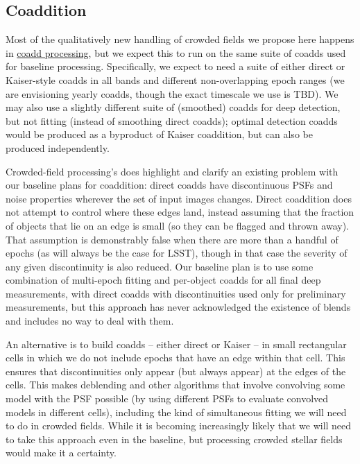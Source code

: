 \documentclass[DM,authoryear,toc]{lsstdoc}
\begin{document}
\subsection{Coaddition}
\label{sec:coaddition}

Most of the qualitatively new handling of crowded fields we propose here happens in \hyperref[sec:coadd-processing]{coadd processing}, but we expect this to run on the same suite of coadds used for baseline processing.
Specifically, we expect to need a suite of either direct or Kaiser-style coadds in all bands and different non-overlapping epoch ranges (we are envisioning yearly coadds, though the exact timescale we use is TBD).
We may also use a slightly different suite of (smoothed) coadds for deep detection, but not fitting (instead of smoothing direct coadds); optimal detection coadds would be produced as a byproduct of Kaiser coaddition, but can also be produced independently.

Crowded-field processing's does highlight and clarify an existing problem with our baseline plans for coaddition: direct coadds have discontinuous PSFs and noise properties wherever the set of input images changes.
Direct coaddition does not attempt to control where these edges land, instead assuming that the fraction of objects that lie on an edge is small (so they can be flagged and thrown away).
That assumption is demonstrably false when there are more than a handful of epochs (as will always be the case for LSST), though in that case the severity of any given discontinuity is also reduced.
Our baseline plan is to use some combination of multi-epoch fitting and per-object coadds for all final deep measurements, with direct coadds with discontinuities used only for preliminary measurements, but this approach has never acknowledged the existence of blends and includes no way to deal with them.

An alternative is to build coadds -- either direct or Kaiser -- in small rectangular cells in which we do not include epochs that have an edge within that cell.
This ensures that discontinuities only appear (but always appear) at the edges of the cells.
This makes deblending and other algorithms that involve convolving some model with the PSF possible (by using different PSFs to evaluate convolved models in different cells), including the kind of simultaneous fitting we will need to do in crowded fields.
While it is becoming increasingly likely that we will need to take this approach even in the baseline, but processing crowded stellar fields would make it a certainty.
\end{document}
